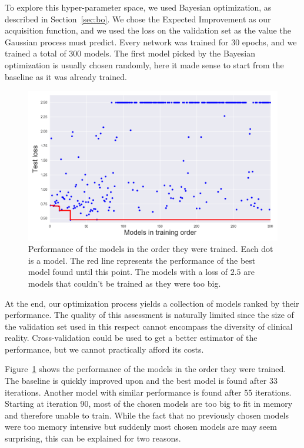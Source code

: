 To explore this hyper-parameter space, we used Bayesian optimization, as described in Section~\ref{sec:bo}. We chose the Expected Improvement as our acquisition function, and we used the loss on the validation set as the value the Gaussian process must predict. Every network was trained for 30 epochs, and we trained a total of 300 models. The first model picked by the Bayesian optimization is usually chosen randomly, here it made sense to start from the baseline as it was already trained.

\begin{figure}[htb]
	\centering
	\includegraphics[width=\linewidth]{img_hyperopt/mrfov_bo_ei}
	\caption{Performance of the models in the order they were trained. Each dot is a model. The red line represents the performance of the best model found until this point. The models with a loss of $2.5$ are models that couldn't be trained as they were too big.}
	\label{fig:mrfov_bo_ei}
\end{figure}

At the end, our optimization process yields a collection of models ranked by their performance. The quality of this assessment is naturally limited since the size of the validation set used in this respect cannot encompass the diversity of clinical reality. Cross-validation could be used to get a better estimator of the performance, but we cannot practically afford its costs. 

Figure~\ref{fig:mrfov_bo_ei} shows the performance of the models in the order they were trained. The baseline is quickly improved upon and the best model is found after 33 iterations. Another model with similar performance is found after 55 iterations. Starting at iteration 90, most of the chosen models are too big to fit in memory and therefore unable to train. While the fact that no previously chosen models were too memory intensive but suddenly most chosen models are may seem surprising, this can be explained for two reasons.

